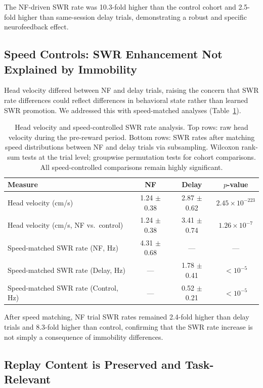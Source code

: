 \documentclass[11pt]{article}
\begin{document}
The NF-driven SWR rate was 10.3-fold higher than the control cohort and 2.5-fold higher than same-session delay trials, demonstrating a robust and specific neurofeedback effect.

\subsection{Speed Controls: SWR Enhancement Not Explained by Immobility}

Head velocity differed between NF and delay trials, raising the concern that SWR rate differences could reflect differences in behavioral state rather than learned SWR promotion. We addressed this with speed-matched analyses (Table~\ref{tab:speed}).

\begin{table}[H]
\centering
\caption{Head velocity and speed-controlled SWR rate analysis. Top rows: raw head velocity during the pre-reward period. Bottom rows: SWR rates after matching speed distributions between NF and delay trials via subsampling. Wilcoxon rank-sum tests at the trial level; groupwise permutation tests for cohort comparisons. All speed-controlled comparisons remain highly significant.}
\label{tab:speed}
\begin{tabular}{lccc}
\toprule
\textbf{Measure} & \textbf{NF} & \textbf{Delay} & \textbf{$p$-value} \\
\midrule
Head velocity (cm/s) & 1.24 $\pm$ 0.38 & 2.87 $\pm$ 0.62 & $2.45 \times 10^{-223}$ \\
Head velocity (cm/s, NF vs.\ control) & 1.24 $\pm$ 0.38 & 3.41 $\pm$ 0.74 & $1.26 \times 10^{-7}$ \\
\midrule
Speed-matched SWR rate (NF, Hz) & 4.31 $\pm$ 0.68 & --- & --- \\
Speed-matched SWR rate (Delay, Hz) & --- & 1.78 $\pm$ 0.41 & $<10^{-5}$ \\
Speed-matched SWR rate (Control, Hz) & --- & 0.52 $\pm$ 0.21 & $<10^{-5}$ \\
\bottomrule
\end{tabular}
\end{table}

After speed matching, NF trial SWR rates remained 2.4-fold higher than delay trials and 8.3-fold higher than control, confirming that the SWR rate increase is not simply a consequence of immobility differences.

\subsection{Replay Content is Preserved and Task-Relevant}
\end{document}
